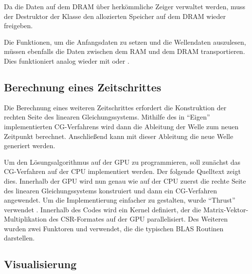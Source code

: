 \documentclass[crop=false,10pt,ngerman]{standalone}
\begin{document}
      Da die Daten auf dem DRAM über herkömmliche Zeiger verwaltet werden, muss der Destruktor der Klasse den allozierten Speicher auf dem DRAM wieder freigeben.

      Die Funktionen, um die Anfangsdaten zu setzen und die Wellendaten auszulesen, müssen ebenfalls die Daten zwischen dem RAM und dem DRAM transportieren.
      Dies funktioniert analog wieder mit  oder .

    \subsection{Berechnung eines Zeitschrittes} %
    \label{sub:time-step-computation}
      Die Berechnung eines weiteren Zeitschrittes erfordert die Konstruktion der rechten Seite des linearen Gleichungssystems.
      Mithilfe des in \enquote{Eigen} implementierten CG-Verfahrens wird dann die Ableitung der Welle zum neuen Zeitpunkt berechnet.
      Anschließend kann mit dieser Ableitung die neue Welle generiert werden.

      Um den Lösungsalgorithmus auf der GPU zu programmieren, soll zunächst das CG-Verfahren auf der CPU implementiert werden.
      Der folgende Quelltext zeigt dies.
      Innerhalb der GPU wird nun genau wie auf der CPU zuerst die rechte Seite des linearen Gleichungssystems konstruiert und dann ein CG-Verfahren angewendet.
      Um die Implementierung einfacher zu gestalten, wurde \enquote{Thrust} verwendet \cite{cuda2018}.
      Innerhalb des Codes wird ein Kernel definiert, der die Matrix-Vektor-Multiplikation des CSR-Formates auf der GPU parallelisiert.
      Des Weiteren wurden zwei Funktoren  und  verwendet, die die typischen BLAS Routinen darstellen.

    \subsection{Visualisierung} %
    \label{sub:visualisierung}
\end{document}
